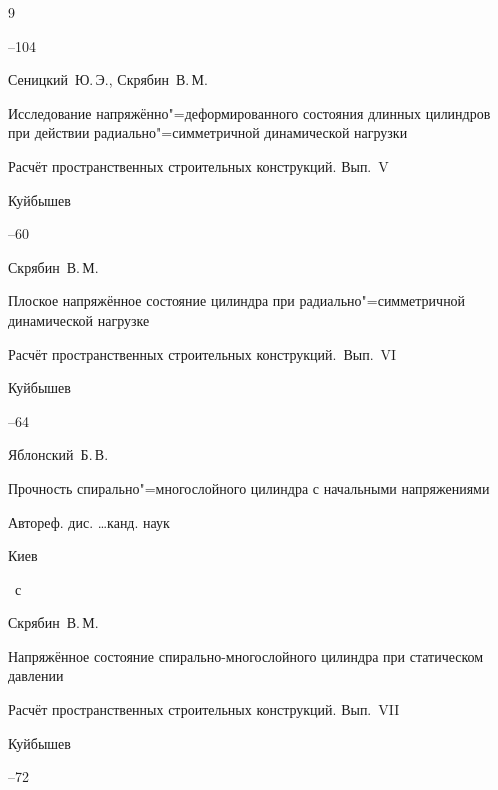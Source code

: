 \begin{thebibliography}{9}

--104




\by Сеницкий~Ю.\,Э., Скрябин~В.\,М. 

\paper Исследование напряжённо"=деформированного состояния длинных цилиндров при действии радиально"=симметричной динамической нагрузки

\inbook Расчёт пространственных строительных конструкций. Вып.~V

\publaddr Куйбышев


--60






\by  Скрябин~В.\,М. 

\paper Плоское напряжённое состояние цилиндра при радиально"=симметричной динамической нагрузке

\inbook Расчёт пространственных строительных конструкций.~Вып.~VI

\publaddr Куйбышев


--64




\by Яблонский~Б.\,В.

\book Прочность спирально"=многослойного цилиндра с начальными напряжениями

\bookinfo Автореф. дис. \dots канд. наук 

\publaddr Киев


~с




\by  Скрябин~В.\,М. 

\paper Напряжённое состояние спирально-многослойного цилиндра при статическом давлении

\inbook Расчёт пространственных строительных конструкций. Вып.~VII

\publaddr Куйбышев


--72





\end{thebibliography}



\makeengtitlem



%

